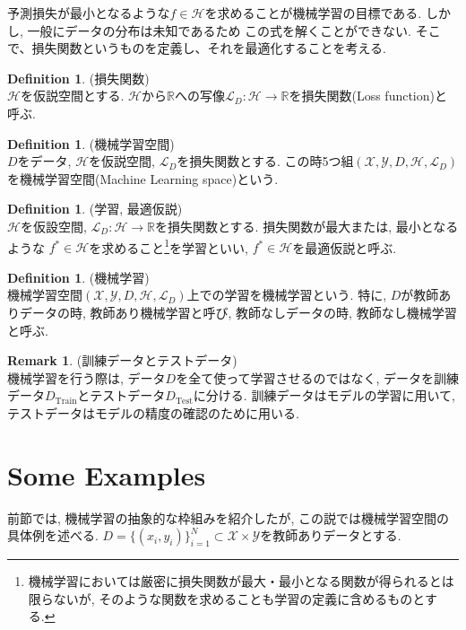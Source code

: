 \documentclass[11pt, a4paper, dvipdfmx]{jsarticle}
\theoremstyle{definition}
\newtheorem{Definition+}[Axiom+]{Definition}
\newtheorem{Remark+}[Axiom+]{Remark}
\newcommand{\R}{\mathbb{R}}
\newcommand{\X}{\mathcal{X}}
\newcommand{\Y}{\mathcal{Y}}
\newcommand{\Hil}{\mathcal{H}}
\newcommand{\Loss}{\mathcal{L}_{D}}
\newcommand{\MLsp}{(\X, \Y, D, \Hil, \Loss)}
\begin{document}
予測損失が最小となるような$f\in\Hil$を求めることが機械学習の目標である. しかし, 一般にデータの分布は未知であるため
この式を解くことができない. そこで、損失関数というものを定義し、それを最適化することを考える.
\begin{Definition+}(損失関数)\\
    $\Hil$を仮説空間とする. $\Hil$から$\R$への写像$\Loss:\Hil\to\R$を損失関数(Loss function)と呼ぶ.
\end{Definition+}
\begin{Definition+}(機械学習空間)\\
    $D$をデータ, $\Hil$を仮説空間, $\Loss$を損失関数とする. 
    この時5つ組$\MLsp$を機械学習空間(Machine Learning space)という.
\end{Definition+}
\begin{Definition+}(学習, 最適仮説)\\
    $\Hil$を仮設空間, $\Loss:\Hil\to\R$を損失関数とする. 損失関数が最大または, 最小となるような
    $f^*\in\Hil$を求めること\footnote{機械学習においては厳密に損失関数が最大・最小となる関数が得られるとは限らないが, そのような関数を求めることも学習の定義に含めるものとする. }を学習といい, $f^*\in\Hil$を最適仮説と呼ぶ.
\end{Definition+}
\begin{Definition+}(機械学習)\\
    機械学習空間$\MLsp$上での学習を機械学習という. 特に, $D$が教師ありデータの時, 教師あり機械学習と呼び, 
    教師なしデータの時, 教師なし機械学習と呼ぶ.
\end{Definition+}
\begin{Remark+}(訓練データとテストデータ)\\
    機械学習を行う際は, データ$D$を全て使って学習させるのではなく, 
    データを訓練データ$D_{\text{Train}}$とテストデータ$D_{\text{Test}}$に分ける. 
    訓練データはモデルの学習に用いて, テストデータはモデルの精度の確認のために用いる. 
\end{Remark+}
\section{Some Examples}
前節では, 機械学習の抽象的な枠組みを紹介したが, この説では機械学習空間の具体例を述べる.
$D = \{(x_i, y_i)\}_{i = 1}^{N}\subset\X\times\Y$を教師ありデータとする.
\end{document}

